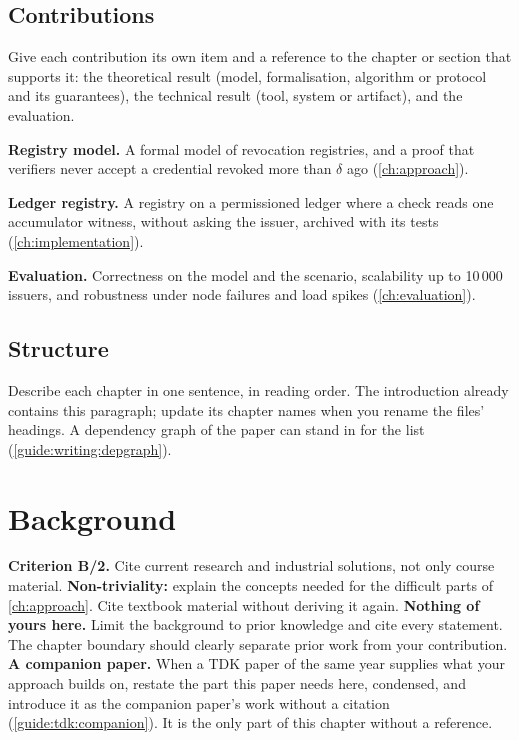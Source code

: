 \subsection[Contributions]{Contributions\skimmark}\label{guide:chapters:contributions}
Give each contribution its own item and a reference to the chapter or section that supports it: the theoretical result (model, formalisation, algorithm or protocol and its guarantees), the technical result (tool, system or artifact), and the evaluation.
\begin{contributions}
  \item\label{guide:c:model} \textbf{Registry model.} A formal model of revocation registries, and a proof that verifiers never accept a credential revoked more than $\delta$ ago (\cref{ch:approach}).
  \item\label{guide:c:registry} \textbf{Ledger registry.} A registry on a permissioned ledger where a check reads one accumulator witness, without asking the issuer, archived with its tests (\cref{ch:implementation}).
  \item\label{guide:c:eval} \textbf{Evaluation.} Correctness on the model and the scenario, scalability up to 10\,000 issuers, and robustness under node failures and load spikes (\cref{ch:evaluation}).
\end{contributions}

\subsection{Structure}\label{guide:chapters:structure}
Describe each chapter in one sentence, in reading order. The introduction already contains this paragraph; update its chapter names when you rename the files' headings. A dependency graph of the paper can stand in for the list (\cref{guide:writing:depgraph}).

\section{Background}\label{guide:chapters:background}
\textbf{Criterion B/2.} Cite current research and industrial solutions, not only course material.
\textbf{Non-triviality:} explain the concepts needed for the difficult parts of \cref{ch:approach}. Cite textbook material without deriving it again.
\textbf{Nothing of yours here.} Limit the background to prior knowledge and cite every statement. The chapter boundary should clearly separate prior work from your contribution.
\textbf{A companion paper.} When a TDK paper of the same year supplies what your approach builds on, restate the part this paper needs here, condensed, and introduce it as the companion paper's work without a citation (\cref{guide:tdk:companion}). It is the only part of this chapter without a reference.

